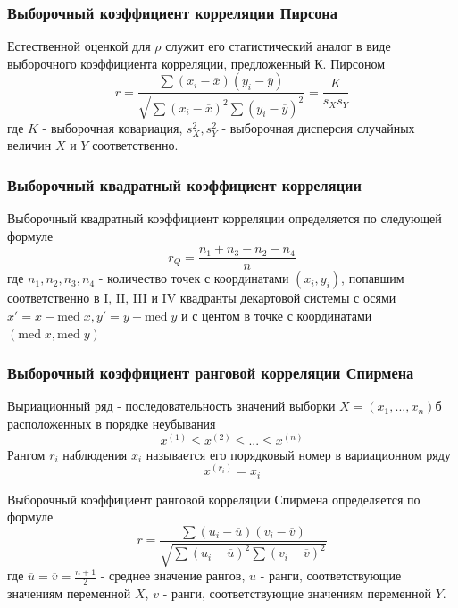 \documentclass{article}
\begin{document}
\subsubsection{Выборочный коэффициент корреляции Пирсона}

Естественной оценкой для $\rho$ служит его статистический аналог в виде выборочного коэффициента корреляции, предложенный К. Пирсоном
\begin{equation}
r = \frac{\sum (x_i - \overline{x})(y_i - \overline{y})}{\sqrt{\sum (x_i - \overline{x})^2 \sum(y_i - \overline{y})^2}} = \frac{K}{s_X s_Y}
\label{eq:3}
\end{equation}
где $K$ - выборочная ковариация, $s_X^2, s_Y^2$ - выборочная дисперсия случайных величин $X$ и $Y$ соответственно.

\subsubsection{Выборочный квадратный коэффициент корреляции}

Выборочный квадратный коэффициент корреляции определяется по следующей формуле 
\begin{equation}
r_Q = \frac{n_1 + n_3 - n_2 - n_4}{n}
\label{eq:4}
\end{equation}
где $n_1, n_2, n_3, n_4$ - количество точек с координатами $(x_i, y_i)$, попавшим соответственно в I, II, III и IV квадранты декартовой системы с осями $x' = x - \mathrm{med}\;x, y' = y - \mathrm{med}\;y$ и с центом в точке с координатами $(\mathrm{med}\;x, \mathrm{med}\;y)$
\begin{figure}[h]
\end{figure}

\subsubsection{Выборочный коэффициент ранговой корреляции Спирмена}

Выриационный ряд  - последовательность значений выборки $X = (x_1,...,x_n)$б расположенных в порядке неубывания
$$
x^{(1)} \le x^{(2)} \le ... \le x^{(n)}
$$
Рангом $r_i$ наблюдения $x_i$ называется его порядковый номер  в вариационном ряду
$$
x^{(r_i)} = x_i
$$

Выборочный коэффициент ранговой корреляции Спирмена определяется по формуле 
\begin{equation}
r = \frac{\sum (u_i - \overline{u})(v_i - \overline{v})}{\sqrt{\sum (u_i - \overline{u})^2 \sum(v_i - \overline{v})^2}}
\label{eq:5}
\end{equation}
где $\overline{u} = \overline{v} = \frac{n + 1}{2}$ - среднее значение рангов, $u$ - ранги, соответствующие значениям переменной $X$, $v$ - ранги, соответствующие значениям переменной $Y$.
\end{document}
